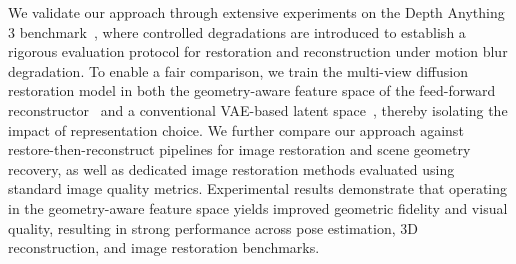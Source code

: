 \documentclass{llmxive}
\begin{document}
We validate our approach through extensive experiments on the Depth Anything 3 benchmark~\cite{depthanything3}, where controlled degradations are introduced to establish a rigorous evaluation protocol for restoration and reconstruction under motion blur degradation. To enable a fair comparison, we train the multi-view diffusion restoration model in both the geometry-aware feature space of the feed-forward reconstructor~\cite{depthanything3} and a conventional VAE-based latent space~\cite{kingma2013auto}, thereby isolating the impact of representation choice. We further compare our approach against restore-then-reconstruct pipelines for image restoration and scene geometry recovery, as well as dedicated image restoration methods evaluated using standard image quality metrics. Experimental results demonstrate that operating in the geometry-aware feature space yields improved geometric fidelity and visual quality, resulting in strong performance across pose estimation, 3D reconstruction, and image restoration benchmarks.






\end{document}
